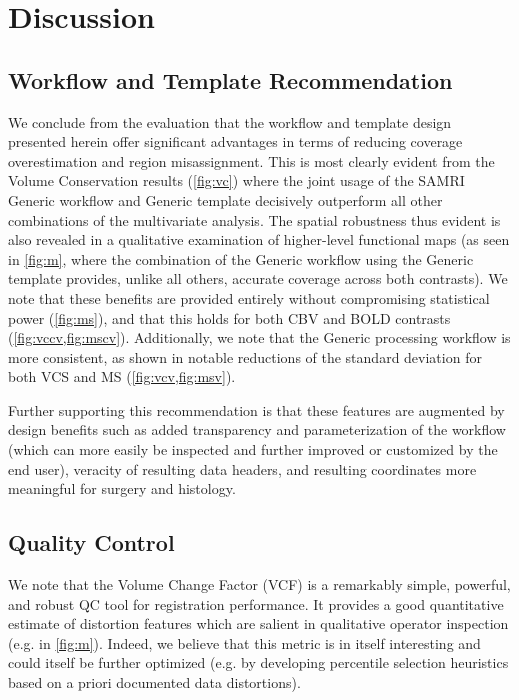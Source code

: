 \section{Discussion}
\subsection{Workflow and Template Recommendation}

We conclude from the evaluation that the workflow and template design presented herein offer significant advantages in terms of reducing coverage overestimation and region misassignment.
This is most clearly evident from the Volume Conservation results (\cref{fig:vc}) where the joint usage of the SAMRI Generic workflow and Generic template decisively outperform all other combinations of the multivariate analysis.
The spatial robustness thus evident is also revealed in a qualitative examination of higher-level functional maps (as seen in \cref{fig:m}, where the combination of the Generic workflow using the Generic template provides, unlike all others, accurate coverage across both contrasts).
We note that these benefits are provided entirely without compromising statistical power (\cref{fig:ms}), and that this holds for both CBV and BOLD contrasts (\cref{fig:vccv,fig:mscv}).
Additionally, we note that the Generic processing workflow is more consistent, as shown in notable reductions of the standard deviation for both VCS and MS (\cref{fig:vcv,fig:msv}).

Further supporting this recommendation is that these features are augmented by design benefits such as added transparency and parameterization of the workflow (which can more easily be inspected and further improved or customized by the end user), veracity of resulting data headers, and resulting coordinates more meaningful for surgery and histology.

\subsection{Quality Control}

We note that the Volume Change Factor (VCF) is a remarkably simple, powerful, and robust QC tool for registration performance.
It provides a good quantitative estimate of distortion features which are salient in qualitative operator inspection (e.g. in \cref{fig:m}).
Indeed, we believe that this metric is in itself interesting and could itself be further optimized (e.g. by developing percentile selection heuristics based on a priori documented data distortions).

